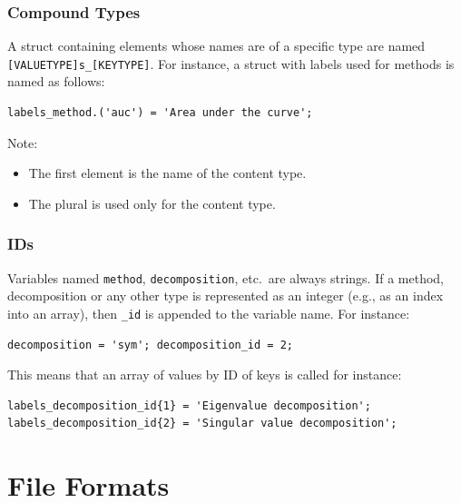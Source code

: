 \documentclass{article}
\begin{document}
\subsubsection{Compound Types}

A struct containing elements whose names are of a specific type are
named \texttt{[VALUETYPE]s\_[KEYTYPE]}.  For instance, a struct with
labels used for methods is named as follows:

\begin{verbatim}
labels_method.('auc') = 'Area under the curve';
\end{verbatim}

Note:
\begin{itemize}
\item The first element is the name of the content type.
\item The plural is used only for the content type.
\end{itemize}

\subsubsection{IDs}

Variables named \texttt{method}, \texttt{decomposition}, etc.\ are
always strings.  If a method, decomposition or any other type is
represented as an integer (e.g., as an index into an array), then
\texttt{\_id} is appended to the variable name. For instance:

\begin{verbatim}
decomposition = 'sym'; decomposition_id = 2;
\end{verbatim}

This means that an array of values by ID of keys is called for instance:

\begin{verbatim}
labels_decomposition_id{1} = 'Eigenvalue decomposition';
labels_decomposition_id{2} = 'Singular value decomposition';
\end{verbatim}

\section{File Formats}
\label{sec:format}
\end{document}
